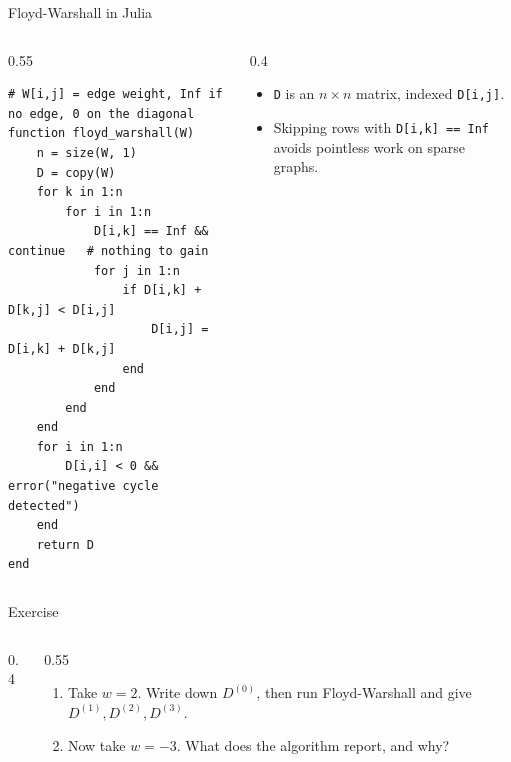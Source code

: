 \documentclass[10pt,aspectratio=169,xcolor=table]{beamer}
\begin{document}
\begin{frame}[fragile]{Floyd-Warshall in Julia}
  \begin{columns}[c]
    \begin{column}{0.55\textwidth}
\begin{lstlisting}[basicstyle=\ttfamily\scriptsize]
# W[i,j] = edge weight, Inf if no edge, 0 on the diagonal
function floyd_warshall(W)
    n = size(W, 1)
    D = copy(W)
    for k in 1:n
        for i in 1:n
            D[i,k] == Inf && continue   # nothing to gain
            for j in 1:n
                if D[i,k] + D[k,j] < D[i,j]
                    D[i,j] = D[i,k] + D[k,j]
                end
            end
        end
    end
    for i in 1:n
        D[i,i] < 0 && error("negative cycle detected")
    end
    return D
end
\end{lstlisting}
    \end{column}
    \begin{column}{0.4\textwidth}
      \begin{itemize}
        \item \texttt{D} is an $n \times n$ matrix, indexed
              \texttt{D[i,j]}.
        \item Skipping rows with \texttt{D[i,k] == Inf} avoids pointless
              work on sparse graphs.
      \end{itemize}
    \end{column}
  \end{columns}
\end{frame}

\begin{frame}{Exercise}
  \begin{columns}[c]
    \begin{column}{0.4\textwidth}
      \begin{center}
      \end{center}
    \end{column}
    \begin{column}{0.55\textwidth}
      \begin{enumerate}
        \item Take $w = 2$. Write down $D^{(0)}$, then run Floyd-Warshall
              and give $D^{(1)}, D^{(2)}, D^{(3)}$.
        \item Now take $w = -3$. What does the algorithm report, and why?
      \end{enumerate}
    \end{column}
  \end{columns}
\end{frame}
\end{document}
